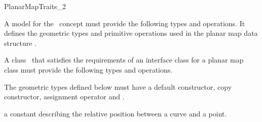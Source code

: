 
\ccRefPageBegin


\begin{ccRefConcept}{PlanarMapTraits_2}
\label{PM_sec:req:interface} 
 
   
   A model for the \ccRefName\ concept must provide the
   following types and operations. It defines the geometric types and
   primitive operations used in the planar map data structure
   .




\ccDefinition
    A class \ccClassTemplateName\ that satisfies the requirements of an
    interface class for a planar map class must provide the
    following types and operations. 

\ccTypes

    The geometric types defined below must have a default constructor,
    copy constructor, assignment operator and .
    
  
     {a constant describing the relative position between
       a curve and a point.}



\end{ccRefConcept}
